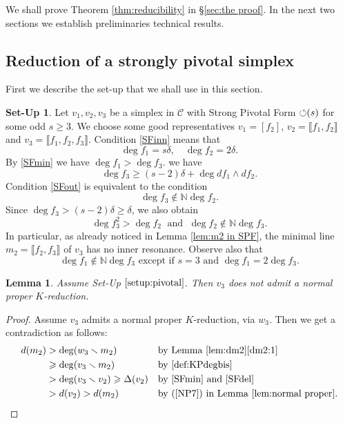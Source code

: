 \documentclass[reqno,oneside,11pt]{amsart}
\theoremstyle{plain}
\newtheorem{lemma}[theorem]{Lemma}
\theoremstyle{definition}
\newtheorem{setup}[theorem]{Set-Up}
\newcommand{\N}{\mathbb{N}}
\newcommand{\PF}{\text{$\circlearrowleft$\!\,}}
\newcommand{\Comp}{\mathcal{C}}
\newcommand{\llb}{\llbracket}
\newcommand{\rrb}{\rrbracket}
\renewcommand{\ge}{\geqslant}
\begin{document}
We shall prove Theorem \ref{thm:reducibility} in \S\ref{sec:the proof}.
In the next two sections we establish preliminaries technical results.

\subsection{Reduction of a strongly pivotal simplex} \label{sec:SP}

First we describe the set-up that we shall use in this section.

\begin{setup} \label{setup:pivotal}
Let $v_1, v_2, v_3$ be a simplex in $\Comp$ with Strong Pivotal Form $\PF(s)$
for some odd $s \ge 3$.
We choose some good representatives $v_1 =[ f_2 ]$, $v_2 = \llb f_1, f_2
\rrb$ and $v_3 = \llb f_1, f_2, f_3 \rrb$.
Condition \ref{SFinn} means that
$$ \deg f_1 = s\delta, \quad \deg f_2 = 2\delta.$$
By \ref{SFmin} we have $\deg f_1 > \deg f_3$.
 we have
$$ \deg f_3 \ge (s-2) \delta + \deg df_1 \wedge df_2 .$$
Condition \ref{SFout} is equivalent to the condition
$$\deg f_3 \not\in \N\deg f_2.$$
Since $\deg f_3 > (s-2)\delta \ge \delta$, we also obtain
\begin{equation}\label{degf2}
\deg f_3^2 > \deg f_2
\;\text{ and }\;
\deg f_2 \not\in \N \deg f_3.
\end{equation}
In particular, as already noticed in Lemma \ref{lem:m2 in SPF}, the minimal line
$m_2 = \llb f_2, f_3 \rrb$ of $v_3$
has no inner resonance.
Observe also that
\begin{equation}\label{degf1}
\deg f_1 \not\in \N \deg f_3 \text{ except if } s = 3 \text{ and } \deg f_1 = 2
\deg f_3.
\end{equation}
\end{setup}

\begin{lemma} \label{lem:no proper K reduction}
Assume Set-Up $\ref{setup:pivotal}$.
Then $v_3$ does not admit a normal proper $K$-reduction.
\end{lemma}

\begin{proof}
Assume $v_3$ admits a normal proper $K$-reduction, via $w_3$.
Then we get a contradiction as follows:
\begin{align*}
d(m_2) &> \deg(w_3 \smallsetminus m_2) &&\text{by Lemma
\ref{lem:dm2}\ref{dm2:1}}\\
 &\ge \deg(v_3 \smallsetminus m_2) &&\text{by \ref{def:KPdegbis}} \\
 &> \deg(v_3 \smallsetminus v_2) \ge \Delta(v_2) && \text{by \ref{SFmin} and
\ref{SFdel}}\\
 &> d(v_2) > d(m_2) &&\text{by (\ref{NP7}) in Lemma \ref{lem:normal
proper}.}\qedhere
\end{align*}
\end{proof}
\end{document}
